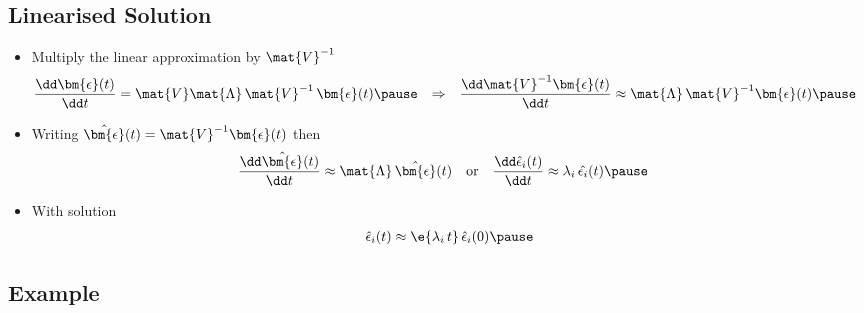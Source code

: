 \begin{slide}
\section[-2]{Linearised Solution}

\begin{PauseHighLight}
  \begin{itemize}
  \item Multiply the linear approximation by $\mat{V}^{-1}$
    \begin{align*}
    \frac{\dd \bm{\epsilon}(t)}{\dd t}
    &= \mat{V} \mat{\Lambda}\,\mat{V}^{-1}\, \bm{\epsilon}(t)\pause
    & \Rightarrow &&
      \frac{\dd \mat{V}^{-1}\bm{\epsilon}(t)}{\dd t} 
      &\approx \mat{\Lambda}\, \mat{V}^{-1}\bm{\epsilon}(t)\pause
    \end{align*}
  \item Writing $\hat{\bm{\epsilon}}(t) = \mat{V}^{-1}\bm{\epsilon}(t)$ then
    \begin{align*}
      \frac{\dd \hat{\bm{\epsilon}}(t)}{\dd t} 
      &\approx \mat{\Lambda}\, \hat{\bm{\epsilon}}(t) & &\text{or} &
      \frac{\dd \hat{\epsilon}_i(t)}{\dd t} 
      &\approx \lambda_i\, \hat{\epsilon_i}(t)\pause
    \end{align*}
  \item With solution
    \begin{align*}
      \hat{\epsilon}_i(t) \approx \e{\lambda_i\,t} \,\hat{\epsilon}_i(0)\pause
    \end{align*}
  \end{itemize}
\end{PauseHighLight}

\end{slide}


\begin{slide}
\section[-2]{Example}

\pause
\pb {}
\begin{center}
  \pause
\end{center}
\end{slide}



